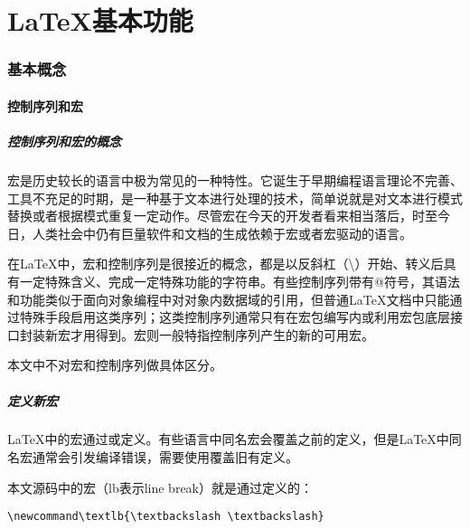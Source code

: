 
\part{\LaTeX 基本功能}

\section{基本概念}

\subsection{控制序列和宏}

\subsubsection{控制序列和宏的概念}

宏是历史较长的语言中极为常见的一种特性。它诞生于早期编程语言理论不完善、工具不充足的时期，是一种基于文本进行处理的技术，简单说就是对文本进行模式替换或者根据模式重复一定动作。尽管宏在今天的开发者看来相当落后，时至今日，人类社会中仍有巨量软件和文档的生成依赖于宏或者宏驱动的语言。

在\LaTeX 中，宏和控制序列是很接近的概念，都是以反斜杠（\textbackslash）开始、转义后具有一定特殊含义、完成一定特殊功能的字符串。有些控制序列带有@符号，其语法和功能类似于面向对象编程中对对象内数据域的引用，但普通\LaTeX 文档中只能通过特殊手段启用这类序列；这类控制序列通常只有在宏包编写内或利用宏包底层接口封装新宏才用得到。宏则一般特指控制序列产生的新的可用宏。

本文中不对宏和控制序列做具体区分。

\subsubsection{定义新宏}

\LaTeX 中的宏通过或定义。有些语言中同名宏会覆盖之前的定义，但是\LaTeX 中同名宏通常会引发编译错误，需要使用覆盖旧有定义。

本文源码中的宏（lb表示line break）就是通过定义的：

\begin{lstlisting}[style = latex_texworks, numbers = none]
\newcommand\textlb{\textbackslash \textbackslash}
\end{lstlisting}

